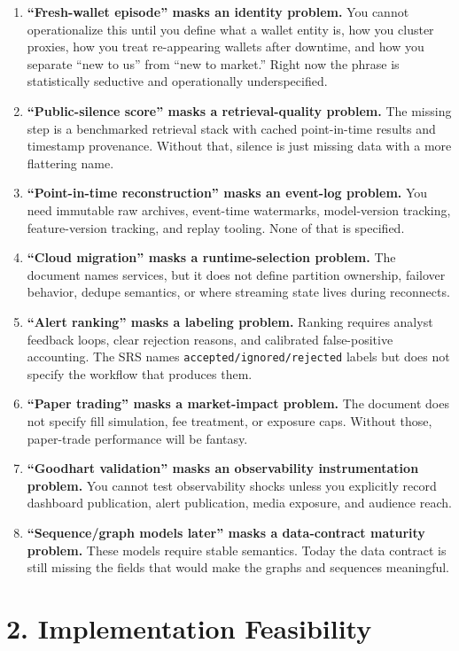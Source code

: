 \documentclass[11pt,letterpaper]{article}
\begin{document}
\begin{enumerate}[leftmargin=1.5em]
    \item \textbf{``Fresh-wallet episode'' masks an identity problem.} You cannot operationalize this until you define what a wallet entity is, how you cluster proxies, how you treat re-appearing wallets after downtime, and how you separate ``new to us'' from ``new to market.'' Right now the phrase is statistically seductive and operationally underspecified.
    \item \textbf{``Public-silence score'' masks a retrieval-quality problem.} The missing step is a benchmarked retrieval stack with cached point-in-time results and timestamp provenance. Without that, silence is just missing data with a more flattering name.
    \item \textbf{``Point-in-time reconstruction'' masks an event-log problem.} You need immutable raw archives, event-time watermarks, model-version tracking, feature-version tracking, and replay tooling. None of that is specified.
    \item \textbf{``Cloud migration'' masks a runtime-selection problem.} The document names services, but it does not define partition ownership, failover behavior, dedupe semantics, or where streaming state lives during reconnects.
    \item \textbf{``Alert ranking'' masks a labeling problem.} Ranking requires analyst feedback loops, clear rejection reasons, and calibrated false-positive accounting. The SRS names \texttt{accepted/ignored/rejected} labels but does not specify the workflow that produces them.
    \item \textbf{``Paper trading'' masks a market-impact problem.} The document does not specify fill simulation, fee treatment, or exposure caps. Without those, paper-trade performance will be fantasy.
    \item \textbf{``Goodhart validation'' masks an observability instrumentation problem.} You cannot test observability shocks unless you explicitly record dashboard publication, alert publication, media exposure, and audience reach.
    \item \textbf{``Sequence/graph models later'' masks a data-contract maturity problem.} These models require stable semantics. Today the data contract is still missing the fields that would make the graphs and sequences meaningful.
\end{enumerate}

\section{2. Implementation Feasibility}
\end{document}
